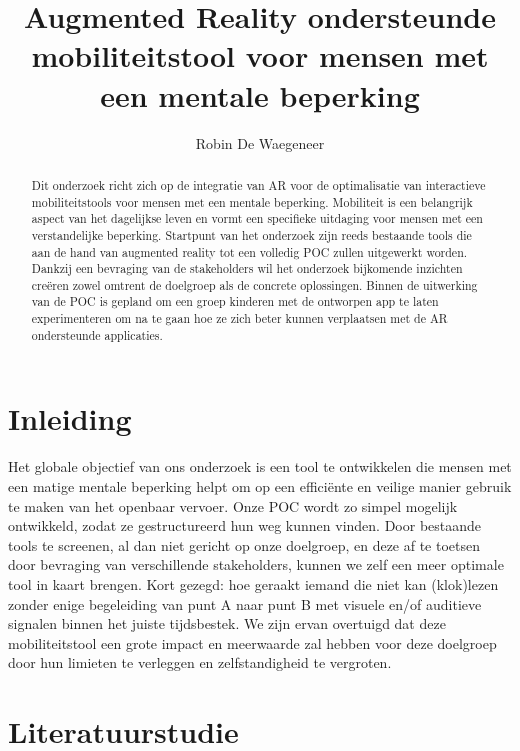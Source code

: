 \documentclass{hogent-article}
\title{Augmented Reality ondersteunde mobiliteitstool voor mensen met een mentale beperking}
\author{Robin De Waegeneer}
\begin{document}
  \begin{abstract}
    Dit onderzoek richt zich op de integratie van AR voor de optimalisatie van interactieve mobiliteitstools voor mensen met een mentale beperking. Mobiliteit is een belangrijk aspect van het dagelijkse leven en vormt een specifieke uitdaging voor mensen met een verstandelijke beperking. Startpunt van het onderzoek zijn reeds bestaande tools die aan de hand van augmented reality tot een volledig POC zullen uitgewerkt worden. Dankzij een bevraging van de stakeholders wil het onderzoek bijkomende inzichten creëren zowel omtrent de doelgroep als de concrete oplossingen. Binnen de uitwerking van de POC is gepland om een groep kinderen met de ontworpen app te laten experimenteren om na te gaan hoe ze zich beter kunnen verplaatsen met de AR ondersteunde applicaties.
  \end{abstract}

\tableofcontents

\bigskip

\section{Inleiding}%
    \label{sec:inleiding}
    
    
    Het globale objectief van ons onderzoek is een tool te ontwikkelen die mensen met een matige mentale beperking helpt om op een efficiënte en veilige manier gebruik te maken van het openbaar vervoer. Onze POC wordt zo simpel mogelijk ontwikkeld, zodat ze gestructureerd hun weg kunnen vinden. Door bestaande tools te screenen, al dan niet gericht op onze doelgroep, en deze af te toetsen door bevraging van verschillende stakeholders, kunnen we zelf een meer optimale tool in kaart brengen. Kort gezegd: hoe geraakt iemand die niet kan (klok)lezen zonder enige begeleiding van punt A naar punt B met visuele en/of auditieve signalen binnen het juiste tijdsbestek.
    We zijn ervan overtuigd dat deze mobiliteitstool een grote impact en meerwaarde zal hebben voor deze doelgroep door hun limieten te verleggen en zelfstandigheid te vergroten.
    
    \section{Literatuurstudie}%
    \label{sec:literatuurstudie}
    
\end{document}
